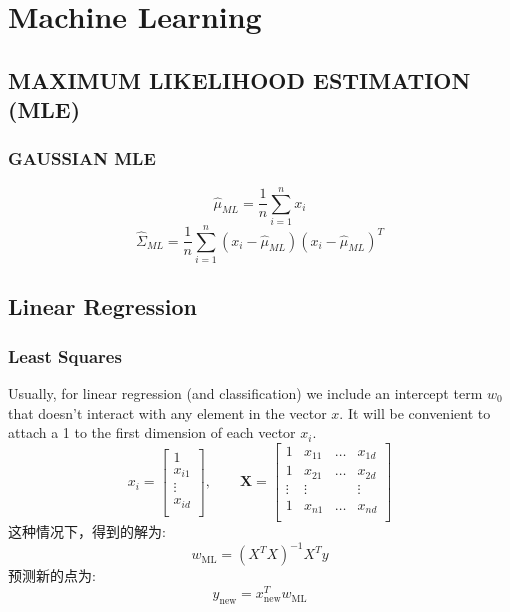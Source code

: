 \documentclass{article} 	%
\begin{document}
\newpage
\section{Machine Learning}
	\subsection{MAXIMUM LIKELIHOOD ESTIMATION (MLE)}
		\subsubsection{GAUSSIAN MLE}
			$$\hat{\mu}_{\scriptscriptstyle ML} = \frac{1}{n}\sum_{i=1}^nx_i$$
			$$\hat{\Sigma}_{\scriptscriptstyle ML} = \frac{1}{n}\sum_{i=1}^n(x_i - \hat{\mu}_{\scriptscriptstyle ML})(x_i - \hat{\mu}_{\scriptscriptstyle ML})^T$$
	
	\subsection{Linear Regression}
		\subsubsection{Least Squares}
			Usually, for linear regression (and classification) we include an intercept term $w_0$ that doesn’t interact with any element in the vector $x$. It will be 
			convenient to attach a 1 to the first dimension of each vector $x_i$.
			\[
			x_i = \left [
				\begin{array}{c}
				1\\
				x_{i1}\\
				\vdots\\
				x_{id}\\
				\end{array}
				\right ]
			, \qquad
			\mathbf{X} = \left [
					    \begin{array}{cccc}
					    1 &x_{11}& \ldots & x_{1d}\\
					    1 &x_{21}& \ldots & x_{2d}\\
					    \vdots &\vdots&  & \vdots\\
					    1 &x_{n1}& \ldots & x_{nd}\\
					    \end{array}
					    \right]
			\]
			这种情况下，得到的解为:
			\[
			w_{\scriptscriptstyle \mathrm{ML}} = (X^TX)^{-1}X^Ty
			\]
			预测新的点为:
			$$y_{\scriptscriptstyle\mathrm{new}} = x_{\scriptscriptstyle\mathrm{new}}^Tw_{\scriptscriptstyle \mathrm{ML}} $$
			
\end{document}
